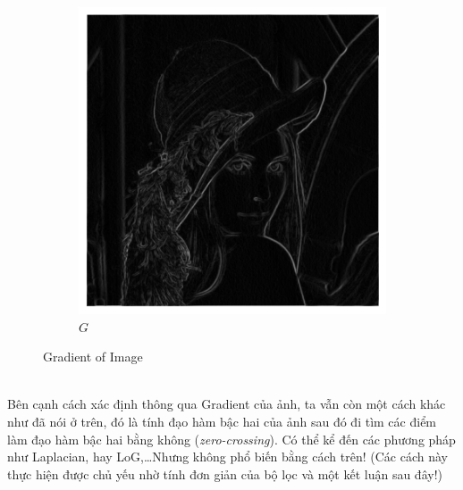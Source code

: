 \documentclass{article}
\begin{document}
\begin{figure}[ht!]
\begin{subfigure}[b]{0.4\linewidth}
        \end{subfigure}
        
        \begin{subfigure}[b]{0.4\linewidth}
        \includegraphics[width = \linewidth]{g.png}
        \caption{$G$}
        
        \end{subfigure}
        \caption{Gradient of Image}
        \label{fig6}
    \end{figure}\phantom{a}\\
    Bên cạnh cách xác định thông qua Gradient của ảnh, ta vẫn còn một cách khác như đã nói ở trên, đó là tính đạo hàm bậc hai của ảnh sau đó đi tìm các điểm làm đạo hàm bậc hai bằng không (\textit{zero-crossing}). Có thể kể đến các phương pháp như Laplacian, hay LoG,\ldots Nhưng không phổ biến bằng cách trên! (Các cách này thực hiện được chủ yếu nhờ tính đơn giản của bộ lọc và một kết luận sau đây!)
\end{document}
